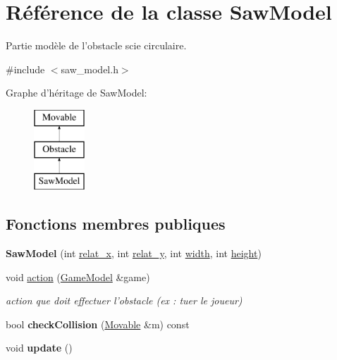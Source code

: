 \hypertarget{class_saw_model}{\section{Référence de la classe Saw\+Model}
\label{class_saw_model}
}


Partie modèle de l'obstacle scie circulaire.  




{\ttfamily \#include $<$saw\+\_\+model.\+h$>$}

Graphe d'héritage de Saw\+Model\+:\begin{figure}[H]
\begin{center}
\leavevmode
\includegraphics[height=3.000000cm]{class_saw_model}
\end{center}
\end{figure}
\subsection*{Fonctions membres publiques}
\begin{DoxyCompactItemize}
\item 
\hypertarget{class_saw_model_aea5aa8c83a8db4e37c06ba00c6c24f44}{{\bfseries Saw\+Model} (int \hyperlink{class_obstacle_a37056563c8469b38aa240c7c423d7280}{relat\+\_\+x}, int \hyperlink{class_obstacle_a754f463db00e74fd5d66a758e4458c26}{relat\+\_\+y}, int \hyperlink{class_movable_a7e4607cccfcc96d2007c2e39c44cab54}{width}, int \hyperlink{class_movable_a192073065bc62d054f259c3b1522c09e}{height})}\label{class_saw_model_aea5aa8c83a8db4e37c06ba00c6c24f44}

\item 
\hypertarget{class_saw_model_ae33c1755134bbcbe11c090a202a294b7}{void \hyperlink{class_saw_model_ae33c1755134bbcbe11c090a202a294b7}{action} (\hyperlink{class_game_model}{Game\+Model} \&game)}\label{class_saw_model_ae33c1755134bbcbe11c090a202a294b7}

\begin{DoxyCompactList}\small\item\em action que doit effectuer l'obstacle (ex \+: tuer le joueur) \end{DoxyCompactList}\item 
\hypertarget{class_saw_model_a801e60b265d554451db931794c99f1e7}{bool {\bfseries check\+Collision} (\hyperlink{class_movable}{Movable} \&m) const }\label{class_saw_model_a801e60b265d554451db931794c99f1e7}

\item 
\hypertarget{class_saw_model_a12e27005aa8e5cab55b6c5ceef53f4e1}{void {\bfseries update} ()}\label{class_saw_model_a12e27005aa8e5cab55b6c5ceef53f4e1}

\end{DoxyCompactItemize}
